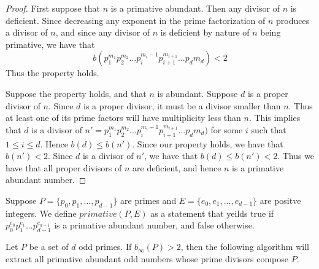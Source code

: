 \documentclass[../paper.tex]{subfiles}
\begin{document}
\begin{proof}
	First suppose that $n$ is a primative abundant. Then any divisor of $n$
is deficient. Since decreasing any exponent in the prime 
factorization of $n$ produces a divisor of $n$, and since any
divisor of $n$ is deficient by nature of $n$ being primative,
we have that 
$$b(p_1^{m_1} p_2^{m_2} ...   p_i^{m_i - 1} p_{i+1}^{m_{i+1}}
... p_d{m_d}) < 2$$
Thus the property holds.

	Suppose the property holds, and that $n$ is abundant. Suppose $d$
is a proper divisor of $n$. Since $d$ is a proper divisor, it must
be a divisor smaller than $n$. Thus at least one of its prime factors
will have multiplicity less than $n$. This implies that $d$ is a 
divisor of
$n' = p_1^{m_1} p_2^{m_2} ...   p_i^{m_i - 1} p_{i+1}^{m_{i+1}}
... p_d{m_d})$ 
for some $i$ such that $1 \leq i \leq d$. Hence $b(d) \leq b(n')$.
Since our property holds, we have that $b(n') < 2$. Since $d$ is
a divisor of $n'$, we have that $b(d) \leq b(n') < 2$. Thus we
have that all proper divisors of $n$ are deficient, and hence $n$ is 
a primative abundant number.
\end{proof}

Suppose $P = \{p_0, p_1, ...,p_{d-1}\}$ are primes and 
$E = \{e_0, e_1, ..., e_{d-1} \}$ are positve integers.
We define $primative(P,E)$ as a statement that yeilds true
if $p_0^{e_0} p_1^{e_1} ... p_{d-1}^{e_{d-1}}$ is a primative
abundant number, and false otherwise.

\begin{theorem} 
Let $P$ be a set of $d$ odd primes. If $b_{\infty}(P) > 2$, then the 
following algorithm will extract all primative
abundant odd numbers whose prime divisors compose $P$.
\end{theorem}
%
%
%
%
%
\end{document}
